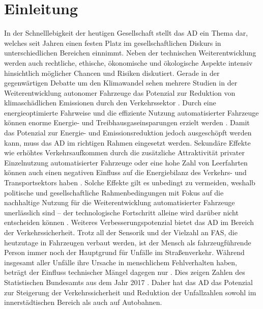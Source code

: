 \chapter{Einleitung}\label{cha:Einleitung}
In der Schnelllebigkeit der heutigen Gesellschaft stellt das \gls{AD} ein Thema dar, welches seit Jahren einen festen Platz im gesellschaftlichen Diskurs in unterschiedlichen Bereichen einnimmt. Neben der technischen Weiterentwicklung werden auch rechtliche, ethische, ökonomische und ökologische Aspekte intensiv hinsichtlich möglicher Chancen und Risiken diskutiert. Gerade in der gegenwärtigen Debatte um den Klimawandel sehen mehrere Studien in der Weiterentwicklung autonomer Fahrzeuge das Potenzial zur Reduktion von klimaschädlichen Emissionen durch den Verkehrssektor \cite{Brost.2020,MichaelKrail.2019,Lee.2019}. Durch eine energieoptimierte Fahrweise und die effiziente Nutzung automatisierter Fahrzeuge können enorme Energie- und Treibhausgaseinsparungen erzielt werden \cite{MichaelKrail.2019}. Damit das Potenzial zur Energie- und Emissionsreduktion jedoch ausgeschöpft werden kann, muss das \gls{AD} im richtigen Rahmen eingesetzt werden. Sekundäre Effekte wie erhöhtes Verkehrsaufkommen durch die zusätzliche Attraktivität privater Einzelnutzung automatisierter Fahrzeuge oder eine hohe Zahl von Leerfahrten können auch einen negativen Einfluss auf die Energiebilanz des Verkehrs- und Transportsektors haben \cite{MichaelKrail.2019,AgoraVerkehrswende.082020}. Solche Effekte gilt es unbedingt zu vermeiden, weshalb politische und gesellschaftliche Rahmenbedingungen mit Fokus auf die nachhaltige Nutzung für die Weiterentwicklung automatisierter Fahrzeuge unerlässlich sind -- der technologische Fortschritt alleine wird darüber nicht entscheiden können \cite{AgoraVerkehrswende.082020}. Weiteres Verbesserungspotenzial bietet das \gls{AD} im Bereich der Verkehrssicherheit. Trotz all der Sensorik und der Vielzahl an \gls{FAS}, die heutzutage in Fahrzeugen verbaut werden, ist der Mensch als fahrzeugführende Person immer noch der Hauptgrund für Unfälle im Straßenverkehr. Während insgesamt  aller Unfälle ihre Ursache in menschlichem Fehlverhalten haben, beträgt der Einfluss technischer Mängel dagegen nur . Dies zeigen Zahlen des Statistischen Bundesamts aus dem Jahr 2017 \cite{StatistischesBundesamt.2017}. Daher hat das \gls{AD} das Potenzial zur Steigerung der Verkehrssicherheit und Reduktion der Unfallzahlen sowohl im innerstädtischen Bereich als auch auf Autobahnen. 

